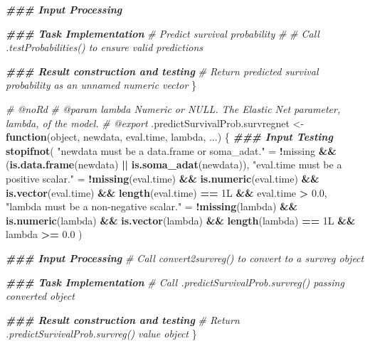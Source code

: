 \documentclass[
]{book}
\newenvironment{Shaded}{\begin{snugshade}}{\end{snugshade}}
\newcommand{\CommentTok}[1]{\textcolor[rgb]{0.56,0.35,0.01}{\textit{#1}}}
\newcommand{\ControlFlowTok}[1]{\textcolor[rgb]{0.13,0.29,0.53}{\textbf{#1}}}
\newcommand{\DocumentationTok}[1]{\textcolor[rgb]{0.56,0.35,0.01}{\textbf{\textit{#1}}}}
\newcommand{\FloatTok}[1]{\textcolor[rgb]{0.00,0.00,0.81}{#1}}
\newcommand{\FunctionTok}[1]{\textcolor[rgb]{0.13,0.29,0.53}{\textbf{#1}}}
\newcommand{\NormalTok}[1]{#1}
\newcommand{\OtherTok}[1]{\textcolor[rgb]{0.56,0.35,0.01}{#1}}
\newcommand{\SpecialCharTok}[1]{\textcolor[rgb]{0.81,0.36,0.00}{\textbf{#1}}}
\newcommand{\StringTok}[1]{\textcolor[rgb]{0.31,0.60,0.02}{#1}}
\begin{document}
\begin{Shaded}
\begin{Highlighting}[]
  \DocumentationTok{\#\#\# Input Processing}
  
  \DocumentationTok{\#\#\# Task Implementation}
  \CommentTok{\# Predict survival probability}
  \CommentTok{\#}
  \CommentTok{\# Call .testProbabilities() to ensure valid predictions}
  
  \DocumentationTok{\#\#\# Result construction and testing}
  \CommentTok{\# Return predicted survival probability as an unnamed numeric vector}
\NormalTok{\}}

\CommentTok{\#\textquotesingle{} @noRd}
\CommentTok{\#\textquotesingle{} @param lambda Numeric or NULL. The Elastic Net parameter, lambda, of the model. }
\CommentTok{\#\textquotesingle{} @export}
\NormalTok{.predictSurvivalProb.survregnet }\OtherTok{\textless{}{-}} \ControlFlowTok{function}\NormalTok{(object, newdata, }
\NormalTok{                                            eval.time, lambda, ...) \{}
  \DocumentationTok{\#\#\# Input Testing}
  \FunctionTok{stopifnot}\NormalTok{(}
    \StringTok{"\textasciigrave{}newdata\textasciigrave{} must be a data.frame or soma\_adat."} \OtherTok{=} 
      \SpecialCharTok{!}\NormalTok{missing }\SpecialCharTok{\&\&}\NormalTok{ (}\FunctionTok{is.data.frame}\NormalTok{(newdata) }\SpecialCharTok{||} \FunctionTok{is.soma\_adat}\NormalTok{(newdata)),}
    \StringTok{"\textasciigrave{}eval.time\textasciigrave{} must be a positive scalar."} \OtherTok{=} 
      \SpecialCharTok{!}\FunctionTok{missing}\NormalTok{(eval.time) }\SpecialCharTok{\&\&} \FunctionTok{is.numeric}\NormalTok{(eval.time) }\SpecialCharTok{\&\&} 
      \FunctionTok{is.vector}\NormalTok{(eval.time) }\SpecialCharTok{\&\&} \FunctionTok{length}\NormalTok{(eval.time) }\SpecialCharTok{==}\NormalTok{ 1L }\SpecialCharTok{\&\&}\NormalTok{ eval.time }\SpecialCharTok{\textgreater{}} \FloatTok{0.0}\NormalTok{,}
    \StringTok{"\textasciigrave{}lambda\textasciigrave{} must be a non{-}negative scalar."} \OtherTok{=} 
      \SpecialCharTok{!}\FunctionTok{missing}\NormalTok{(lambda) }\SpecialCharTok{\&\&} \FunctionTok{is.numeric}\NormalTok{(lambda) }\SpecialCharTok{\&\&} \FunctionTok{is.vector}\NormalTok{(lambda) }\SpecialCharTok{\&\&} 
      \FunctionTok{length}\NormalTok{(lambda) }\SpecialCharTok{==}\NormalTok{ 1L }\SpecialCharTok{\&\&}\NormalTok{ lambda }\SpecialCharTok{\textgreater{}=} \FloatTok{0.0}
\NormalTok{  )}
  
  \DocumentationTok{\#\#\# Input Processing}
  \CommentTok{\# Call convert2survreg() to convert to a \textasciigrave{}survreg\textasciigrave{} object}
  
  \DocumentationTok{\#\#\# Task Implementation}
  \CommentTok{\# Call .predictSurvivalProb.survreg() passing converted object}
  
  \DocumentationTok{\#\#\# Result construction and testing}
  \CommentTok{\# Return \textasciigrave{}.predictSurvivalProb.survreg()\textasciigrave{} value object}
\NormalTok{\}}
\end{Highlighting}
\end{Shaded}
\end{document}
